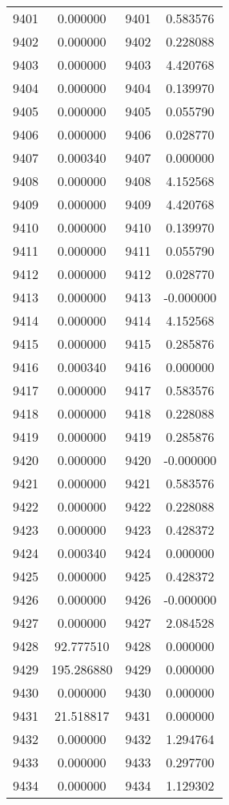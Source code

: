 \documentclass[12pt]{article}
\begin{document}
\begin{longtable}{@{}cccc@{}}
9401 & 0.000000 & 9401 & 0.583576 \\
9402 & 0.000000 & 9402 & 0.228088 \\
9403 & 0.000000 & 9403 & 4.420768 \\
9404 & 0.000000 & 9404 & 0.139970 \\
9405 & 0.000000 & 9405 & 0.055790 \\
9406 & 0.000000 & 9406 & 0.028770 \\
9407 & 0.000340 & 9407 & 0.000000 \\
9408 & 0.000000 & 9408 & 4.152568 \\
9409 & 0.000000 & 9409 & 4.420768 \\
9410 & 0.000000 & 9410 & 0.139970 \\
9411 & 0.000000 & 9411 & 0.055790 \\
9412 & 0.000000 & 9412 & 0.028770 \\
9413 & 0.000000 & 9413 & -0.000000 \\
9414 & 0.000000 & 9414 & 4.152568 \\
9415 & 0.000000 & 9415 & 0.285876 \\
9416 & 0.000340 & 9416 & 0.000000 \\
9417 & 0.000000 & 9417 & 0.583576 \\
9418 & 0.000000 & 9418 & 0.228088 \\
9419 & 0.000000 & 9419 & 0.285876 \\
9420 & 0.000000 & 9420 & -0.000000 \\
9421 & 0.000000 & 9421 & 0.583576 \\
9422 & 0.000000 & 9422 & 0.228088 \\
9423 & 0.000000 & 9423 & 0.428372 \\
9424 & 0.000340 & 9424 & 0.000000 \\
9425 & 0.000000 & 9425 & 0.428372 \\
9426 & 0.000000 & 9426 & -0.000000 \\
9427 & 0.000000 & 9427 & 2.084528 \\
9428 & 92.777510 & 9428 & 0.000000 \\
9429 & 195.286880 & 9429 & 0.000000 \\
9430 & 0.000000 & 9430 & 0.000000 \\
9431 & 21.518817 & 9431 & 0.000000 \\
9432 & 0.000000 & 9432 & 1.294764 \\
9433 & 0.000000 & 9433 & 0.297700 \\
9434 & 0.000000 & 9434 & 1.129302 \\

\end{longtable}
\end{document}
